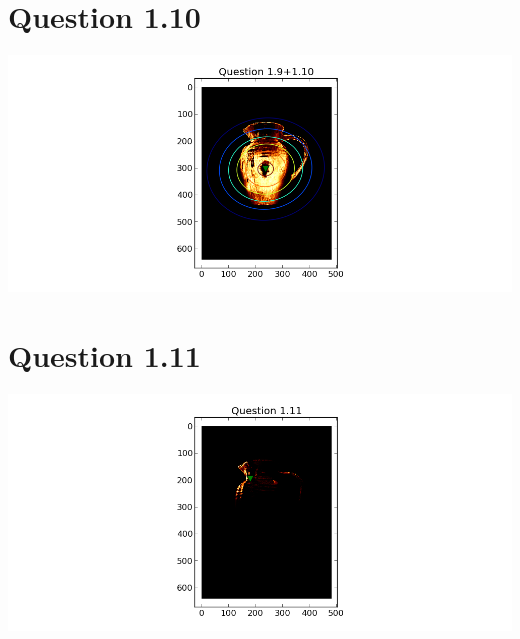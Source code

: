 \documentclass[11pt,a4paper]{article}
\begin{document}
\section{Question 1.10}
\includegraphics[scale=0.6]{figure_8.png}
\section{Question 1.11}
\includegraphics[scale=0.6]{figure_9.png}
\end{document}
